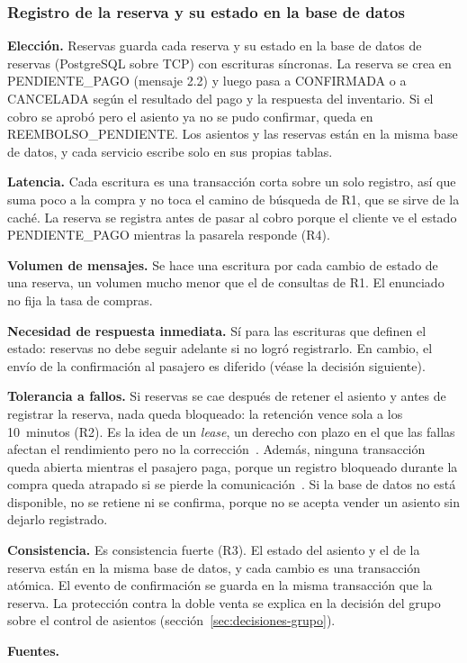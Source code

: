 \documentclass[11pt,a4paper]{article}
\newcommand{\decision}[8]{\subsubsection*{#1}%
  \textbf{Elección.} #2\par
  \textbf{Latencia.} #3\par
  \textbf{Volumen de mensajes.} #4\par
  \textbf{Necesidad de respuesta inmediata.} #5\par
  \textbf{Tolerancia a fallos.} #6\par
  \textbf{Consistencia.} #7\par
  \textbf{Fuentes.} #8\par}
\begin{document}
\decision{Registro de la reserva y su estado en la base de datos}
 {Reservas guarda cada reserva y su estado en la base de datos de reservas (PostgreSQL sobre TCP) con escrituras síncronas. La reserva se crea en PENDIENTE\_PAGO (mensaje 2.2) y luego pasa a CONFIRMADA o a CANCELADA según el resultado del pago y la respuesta del inventario. Si el cobro se aprobó pero el asiento ya no se pudo confirmar, queda en REEMBOLSO\_PENDIENTE. Los asientos y las reservas están en la misma base de datos, y cada servicio escribe solo en sus propias tablas.}
 {Cada escritura es una transacción corta sobre un solo registro, así que suma poco a la compra y no toca el camino de búsqueda de R1, que se sirve de la caché. La reserva se registra antes de pasar al cobro porque el cliente ve el estado PENDIENTE\_PAGO mientras la pasarela responde (R4).}
 {Se hace una escritura por cada cambio de estado de una reserva, un volumen mucho menor que el de consultas de R1. El enunciado no fija la tasa de compras.}
 {Sí para las escrituras que definen el estado: reservas no debe seguir adelante si no logró registrarlo. En cambio, el envío de la confirmación al pasajero es diferido (véase la decisión siguiente).}
 {Si reservas se cae después de retener el asiento y antes de registrar la reserva, nada queda bloqueado: la retención vence sola a los 10~minutos (R2). Es la idea de un \emph{lease}, un derecho con plazo en el que las fallas afectan el rendimiento pero no la corrección~\cite{gray1989leases}. Además, ninguna transacción queda abierta mientras el pasajero paga, porque un registro bloqueado durante la compra queda atrapado si se pierde la comunicación~\cite{laux2009occ}. Si la base de datos no está disponible, no se retiene ni se confirma, porque no se acepta vender un asiento sin dejarlo registrado.}
 {Es consistencia fuerte (R3). El estado del asiento y el de la reserva están en la misma base de datos, y cada cambio es una transacción atómica. El evento de confirmación se guarda en la misma transacción que la reserva. La protección contra la doble venta se explica en la decisión del grupo sobre el control de asientos (sección~\ref{sec:decisiones-grupo}).}
 {\cite{gray1989leases,laux2009occ}}
\end{document}
